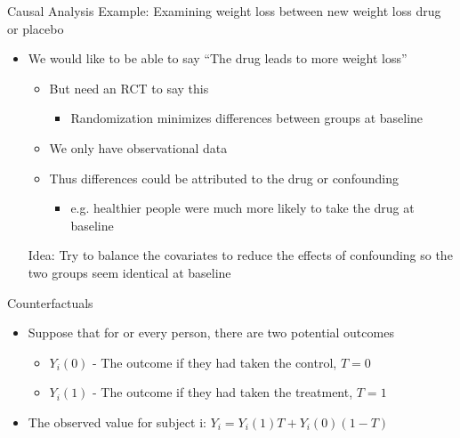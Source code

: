 \begin{frame}{Causal Analysis}
Example: Examining weight loss between new weight loss drug or placebo
 \begin{itemize}
  \item We would like to be able to say ``The drug leads to more weight loss''
  \begin{itemize}
   \item But need an RCT to say this
   \begin{itemize}
    \item Randomization minimizes differences between groups at baseline
   \end{itemize}

   \item We only have observational data
   \item Thus differences could be attributed to the drug or confounding
   
   \begin{itemize}
    \item e.g. healthier people were much more likely to take the drug at baseline
   \end{itemize}

  \end{itemize}
Idea: Try to balance the covariates to reduce the effects of confounding
so the two groups seem identical at baseline
 \end{itemize}
\end{frame}

\begin{frame}{Counterfactuals}
\begin{itemize}
 \item Suppose that for or every person, there are two potential outcomes
 \begin{itemize}
  \item $Y_i(0)$ - The outcome if they had taken the control, $T=0$
  \item $Y_i(1)$ - The outcome if they had taken the treatment, $T=1$
 \end{itemize}
 \item The observed value for subject i: $Y_i=Y_i(1)T+Y_i(0)(1-T)$
  \end{itemize}
\end{frame}




